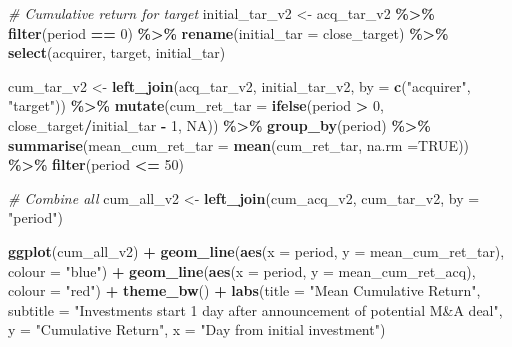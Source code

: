 \documentclass[
]{article}
\newenvironment{Shaded}{\begin{snugshade}}{\end{snugshade}}
\newcommand{\CommentTok}[1]{\textcolor[rgb]{0.56,0.35,0.01}{\textit{#1}}}
\newcommand{\DataTypeTok}[1]{\textcolor[rgb]{0.13,0.29,0.53}{#1}}
\newcommand{\DecValTok}[1]{\textcolor[rgb]{0.00,0.00,0.81}{#1}}
\newcommand{\KeywordTok}[1]{\textcolor[rgb]{0.13,0.29,0.53}{\textbf{#1}}}
\newcommand{\NormalTok}[1]{#1}
\newcommand{\OperatorTok}[1]{\textcolor[rgb]{0.81,0.36,0.00}{\textbf{#1}}}
\newcommand{\OtherTok}[1]{\textcolor[rgb]{0.56,0.35,0.01}{#1}}
\newcommand{\StringTok}[1]{\textcolor[rgb]{0.31,0.60,0.02}{#1}}
\begin{document}
\begin{Shaded}
\begin{Highlighting}[]
\CommentTok{\# Cumulative return for target}
\NormalTok{initial\_tar\_v2 \textless{}{-}}\StringTok{ }\NormalTok{acq\_tar\_v2 }\OperatorTok{\%\textgreater{}\%}
\StringTok{  }\KeywordTok{filter}\NormalTok{(period }\OperatorTok{==}\StringTok{ }\DecValTok{0}\NormalTok{) }\OperatorTok{\%\textgreater{}\%}
\StringTok{  }\KeywordTok{rename}\NormalTok{(}\DataTypeTok{initial\_tar =}\NormalTok{ close\_target) }\OperatorTok{\%\textgreater{}\%}
\StringTok{  }\KeywordTok{select}\NormalTok{(acquirer, target, initial\_tar)}

\NormalTok{cum\_tar\_v2 \textless{}{-}}\StringTok{ }\KeywordTok{left\_join}\NormalTok{(acq\_tar\_v2, initial\_tar\_v2, }\DataTypeTok{by =} \KeywordTok{c}\NormalTok{(}\StringTok{"acquirer"}\NormalTok{, }\StringTok{"target"}\NormalTok{)) }\OperatorTok{\%\textgreater{}\%}
\StringTok{  }\KeywordTok{mutate}\NormalTok{(}\DataTypeTok{cum\_ret\_tar =} \KeywordTok{ifelse}\NormalTok{(period }\OperatorTok{\textgreater{}}\StringTok{ }\DecValTok{0}\NormalTok{, close\_target}\OperatorTok{/}\NormalTok{initial\_tar }\OperatorTok{{-}}\StringTok{ }\DecValTok{1}\NormalTok{, }\OtherTok{NA}\NormalTok{)) }\OperatorTok{\%\textgreater{}\%}
\StringTok{  }\KeywordTok{group\_by}\NormalTok{(period) }\OperatorTok{\%\textgreater{}\%}
\StringTok{  }\KeywordTok{summarise}\NormalTok{(}\DataTypeTok{mean\_cum\_ret\_tar =} \KeywordTok{mean}\NormalTok{(cum\_ret\_tar, }\DataTypeTok{na.rm =}\OtherTok{TRUE}\NormalTok{)) }\OperatorTok{\%\textgreater{}\%}
\StringTok{  }\KeywordTok{filter}\NormalTok{(period }\OperatorTok{\textless{}=}\StringTok{ }\DecValTok{50}\NormalTok{)}
\end{Highlighting}
\end{Shaded}

\begin{Shaded}
\begin{Highlighting}[]
\CommentTok{\# Combine all}
\NormalTok{cum\_all\_v2 \textless{}{-}}\StringTok{ }\KeywordTok{left\_join}\NormalTok{(cum\_acq\_v2, cum\_tar\_v2, }\DataTypeTok{by =} \StringTok{"period"}\NormalTok{)}
  

\KeywordTok{ggplot}\NormalTok{(cum\_all\_v2) }\OperatorTok{+}
\StringTok{  }
\StringTok{  }\KeywordTok{geom\_line}\NormalTok{(}\KeywordTok{aes}\NormalTok{(}\DataTypeTok{x =}\NormalTok{ period, }\DataTypeTok{y =}\NormalTok{ mean\_cum\_ret\_tar), }\DataTypeTok{colour =} \StringTok{"blue"}\NormalTok{) }\OperatorTok{+}
\StringTok{  }\KeywordTok{geom\_line}\NormalTok{(}\KeywordTok{aes}\NormalTok{(}\DataTypeTok{x =}\NormalTok{ period, }\DataTypeTok{y =}\NormalTok{ mean\_cum\_ret\_acq), }\DataTypeTok{colour =} \StringTok{"red"}\NormalTok{) }\OperatorTok{+}
\StringTok{  }\KeywordTok{theme\_bw}\NormalTok{() }\OperatorTok{+}
\StringTok{  }\KeywordTok{labs}\NormalTok{(}\DataTypeTok{title =} \StringTok{"Mean Cumulative Return"}\NormalTok{,}
       \DataTypeTok{subtitle =} \StringTok{"Investments start 1 day after announcement of potential M\&A deal"}\NormalTok{,}
       \DataTypeTok{y =} \StringTok{"Cumulative Return"}\NormalTok{,}
       \DataTypeTok{x =} \StringTok{"Day from initial investment"}\NormalTok{)}
\end{Highlighting}
\end{Shaded}
\end{document}
